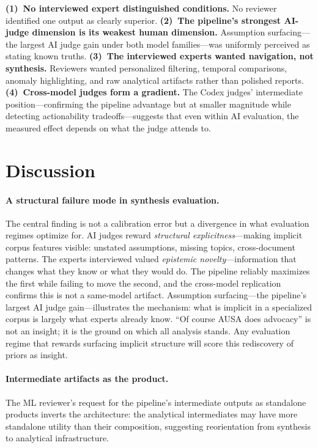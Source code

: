 \documentclass{article}
\begin{document}
\textbf{(1)~No interviewed expert distinguished conditions.} No reviewer identified one output as clearly superior. \textbf{(2)~The pipeline's strongest AI-judge dimension is its weakest human dimension.} Assumption surfacing---the largest AI judge gain under both model families---was uniformly perceived as stating known truths. \textbf{(3)~The interviewed experts wanted navigation, not synthesis.} Reviewers wanted personalized filtering, temporal comparisons, anomaly highlighting, and raw analytical artifacts rather than polished reports. \textbf{(4)~Cross-model judges form a gradient.} The Codex judges' intermediate position---confirming the pipeline advantage but at smaller magnitude while detecting actionability tradeoffs---suggests that even within AI evaluation, the measured effect depends on what the judge attends to.

\section{Discussion}
\label{sec:discussion}

\paragraph{A structural failure mode in synthesis evaluation.} The central finding is not a calibration error but a divergence in what evaluation regimes optimize for. AI judges reward \textit{structural explicitness}---making implicit corpus features visible: unstated assumptions, missing topics, cross-document patterns. The experts interviewed valued \textit{epistemic novelty}---information that changes what they know or what they would do. The pipeline reliably maximizes the first while failing to move the second, and the cross-model replication confirms this is not a same-model artifact. Assumption surfacing---the pipeline's largest AI judge gain---illustrates the mechanism: what is implicit in a specialized corpus is largely what experts already know. ``Of course AUSA does advocacy'' is not an insight; it is the ground on which all analysis stands. Any evaluation regime that rewards surfacing implicit structure will score this rediscovery of priors as insight.

\paragraph{Intermediate artifacts as the product.} The ML reviewer's request for the pipeline's intermediate outputs as standalone products inverts the architecture: the analytical intermediates may have more standalone utility than their composition, suggesting reorientation from synthesis to analytical infrastructure.
\end{document}
